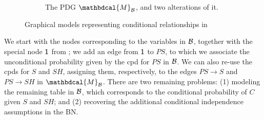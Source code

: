 \documentclass[letterpaper]{article} %
\theoremstyle{plain}
\theoremstyle{definition}
\theoremstyle{remark}
\newcommand{\dg}[1]{\mathbdcal{#1}}
\newcommand{\PDGof}[1]{{\dg M}_{#1}}
\begin{document}
\begin{example}[emulating a BN]
\begin{figure*}[ht!]
\begin{subfigure}[b]{0.57\textwidth}
{}

\caption{The PDG $\PDGof{{\mathcal B}}$, and two alterations of it.} 
		\label{subfig:smoking-pdg}
	\end{subfigure}

    \caption{Graphical models representing conditional relationships in }
	\label{fig:smoking-bn+pdg}
\end{figure*}
		
We start with the nodes corresponding to the variables in $\cal B$, together
with the special node $\sf 1$ from ; we add an edge
from ${\sf 1}$ to $\mathit{PS}$, to which we associate the unconditional
probability given by the cpd for $\mathit{PS}$ in $\cal B$. We can also re-use
the cpds for $S$ and $\mathit{SH}$, assigning them, respectively, to the edges
$PS \to S$ and $PS \to SH$ in $\PDGof{{\mathcal B}}$.
There are two remaining problems: (1) modeling the remaining table in $\cal B$,
which corresponds to the conditional probability of $C$ given $S$ and $SH$; and
(2) recovering the additional
conditional
independence assumptions in the BN. 


\end{example}
\end{document}

